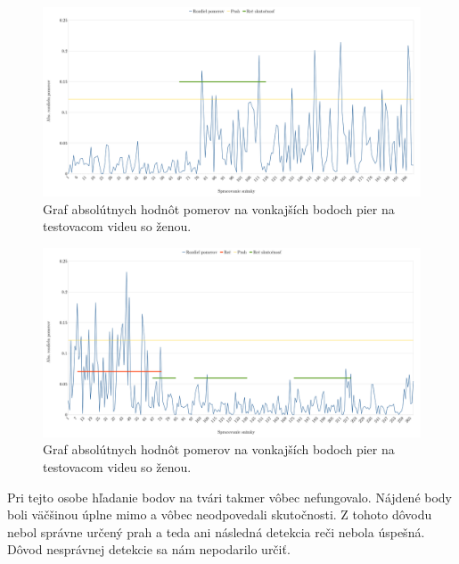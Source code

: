 \begin{figure}[H]
	\begin{center}
		\includegraphics[width=\textwidth]{pics/pataTrening.png}
		\caption{Graf absolútnych hodnôt pomerov na vonkajších bodoch pier na testovacom videu so ženou.}
		\label{pic-dadaTrening}
	\end{center}
\end{figure}

\begin{figure}[H]
	\begin{center}
		\includegraphics[width=\textwidth]{pics/pataTest.png}
		\caption{Graf absolútnych hodnôt pomerov na vonkajších bodoch pier na testovacom videu so ženou.}
		\label{pic-dadaTest}
	\end{center}
\end{figure}
Pri tejto osobe hľadanie bodov na tvári takmer vôbec nefungovalo. 
Nájdené body boli väčšinou úplne mimo a vôbec neodpovedali skutočnosti.
Z tohoto dôvodu nebol správne určený prah a teda ani následná detekcia reči nebola úspešná.
Dôvod nesprávnej detekcie sa nám nepodarilo určiť.

